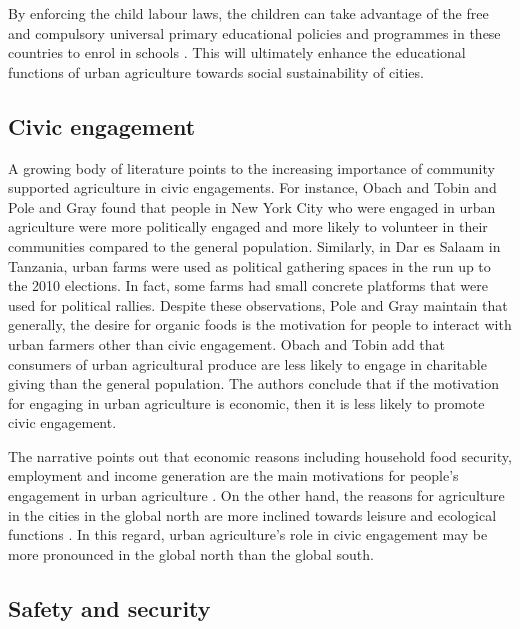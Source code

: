 By enforcing the child labour laws, the children can take advantage of the free and compulsory universal primary educational policies and programmes in these countries to enrol in schools \cite{Nishimura2013}. This will ultimately enhance the educational functions of urban agriculture towards social sustainability of cities.

\subsection{Civic engagement}

A growing body of literature points to the increasing importance of community supported agriculture in civic engagements. For instance, Obach and Tobin \cite{Obach2014} and Pole and Gray \cite{Pole2013} found that people in New York City who were engaged in urban agriculture were more politically engaged and more likely to volunteer in their communities compared to the general population. Similarly, in Dar es Salaam in Tanzania, urban farms were used as political gathering spaces in the run up to the 2010 elections. In fact, some farms had small concrete platforms that were used for political rallies. Despite these observations, Pole and Gray \cite{Pole2013} maintain that generally, the desire for organic foods is the motivation for people to interact with urban farmers other than civic engagement. Obach and Tobin \cite{Obach2014} add that consumers of urban agricultural produce are less likely to engage in charitable giving than the general population. The authors conclude that if the motivation for engaging in urban agriculture is economic, then it is less likely to promote civic engagement.

The narrative points out that economic reasons including household food security, employment and income generation are the main motivations for people's engagement in urban agriculture \cite{Amponsah2016a, Kodjo2014, InternationalLabourOrganization2006, Zezza2010, Amoah2007}. On the other hand, the reasons for agriculture in the cities in the global north are more inclined towards leisure and ecological functions \cite{InternationalLabourOrganization2006, Hamilton2014}. In this regard, urban agriculture's role in civic engagement may be more pronounced in the global north than the global south.

\subsection{Safety and security}

